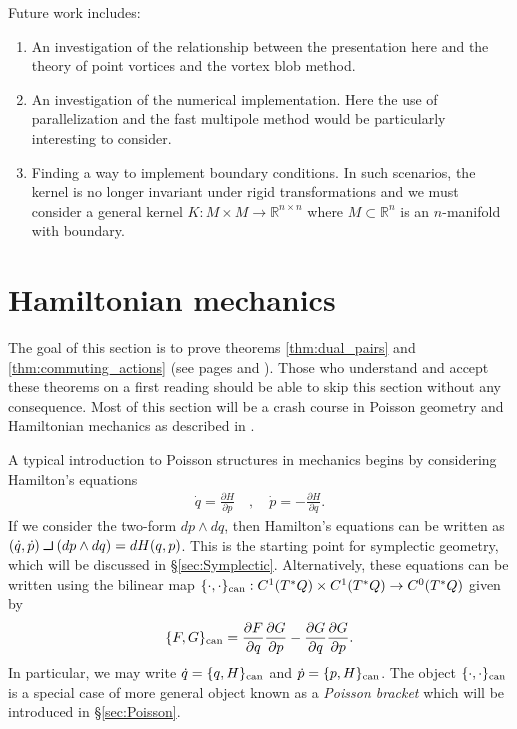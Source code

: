 \documentclass[12pt]{amsart}
\newcommand{\pder}[2]{\ensuremath{\frac{\partial #1}{\partial #2}}}
\def\contract{\makebox[1.2em][c]{\mbox{\rule{.6em}
{.01truein}\rule{.01truein}{.6em}}}}
\begin{document}
Future work includes:
\begin{enumerate}
	\item An investigation of the relationship between the presentation here and the theory of point vortices and the vortex blob method.
	\item An investigation of the numerical implementation.
		Here the use of parallelization and the fast multipole method would be particularly interesting to consider.
	\item Finding a way to implement boundary conditions.
		In such scenarios, the kernel is no longer invariant under rigid transformations
		and we must consider a general kernel $K:M \times M \to \mathbb{R}^{n \times n}$
		where $M \subset \mathbb{R}^n$ is an $n$-manifold with boundary.
\end{enumerate}

\appendix

\section{Hamiltonian mechanics}
\label{sec:Hamiltonian}
The goal of this section is to prove theorems \ref{thm:dual_pairs}
and \ref{thm:commuting_actions} (see pages \pageref{thm:dual_pairs} and \pageref{thm:commuting_actions}).
Those who understand and accept these theorems on a first reading
should be able to skip this section without any consequence.
Most of this section will be a crash course in Poisson geometry
and Hamiltonian mechanics as described in \cite{FOM,MandS,Weinstein1983}.

A typical introduction to Poisson structures in mechanics
begins by considering Hamilton's equations
\begin{align*}
  \dot{q} = \pder{H}{p} \quad, \quad  \dot{p} = - \pder{H}{q}.
\end{align*}
If we consider the two-form $dp \wedge dq$, then Hamilton's equations
can be written as $(\dot{q},\dot{p}) \contract (dp \wedge dq) = dH(q,p)$.
This is the starting point for symplectic geometry, which
will be discussed in \S \ref{sec:Symplectic}.
Alternatively, these equations can be written using the bilinear map $\{ \cdot , \cdot \}_{\rm can} : C^1( T^*Q) \times C^1(T^*Q) \to C^0(T^*Q)$
given by
\begin{align*}
  \{ F , G \}_{\rm can} = \pder{F}{q}\pder{G}{p} - \pder{G}{q} \pder{G}{p}.
\end{align*}
In particular, we may write $\dot{q} = \{ q , H \}_{\rm can}$ and $\dot{p} = \{ p , H\}_{\rm can}$.
The object $\{ \cdot , \cdot \}_{\rm can}$ is a special case of more general
object known as a \emph{Poisson bracket} which will be introduced in
\S \ref{sec:Poisson}.
\end{document}
